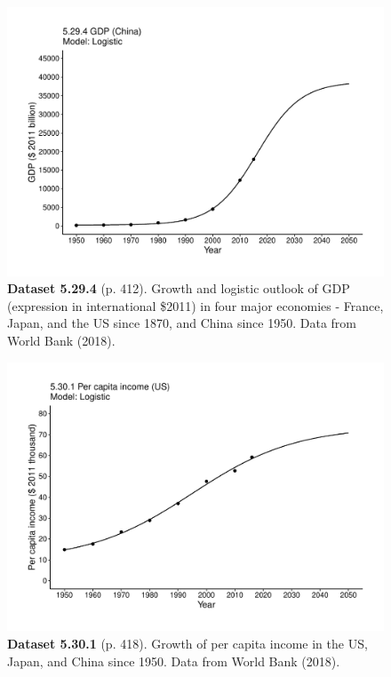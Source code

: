 \documentclass[aps,rmp,preprint,superscriptaddress,10pt,onecolumn]{article}
\begin{document}
\clearpage
\begin{figure}[h]
\includegraphics[width=\textwidth]{output/figs-ggplot/5.29.4.pdf}
\caption*{\textbf{Dataset 5.29.4} (p. 412). Growth and logistic outlook of GDP (expression in international \$2011) in four major economies - France, Japan, and the US since 1870, and China since 1950. Data from World Bank (2018).}
\end{figure}
	
\clearpage
\begin{figure}[h]
\includegraphics[width=\textwidth]{output/figs-ggplot/5.30.1.pdf}
\caption*{\textbf{Dataset 5.30.1} (p. 418). Growth of per capita income in the US, Japan, and China since 1950. Data from World Bank (2018).}
\end{figure}
	
\end{document}
